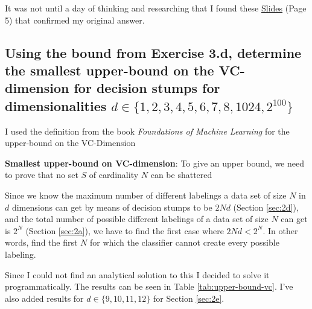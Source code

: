 \documentclass[11pt,a4paper]{article}
\begin{document}
It was not until a day of thinking and researching that I found these \href{https://people.csail.mit.edu/alinush/6.867-fall-2013/2013.10.22.w8.tu-lecture-13-generalization-part-2.pdf}{Slides} (Page 5) that confirmed my original answer.

\subsection{Using the bound from Exercise 3.d, determine the smallest upper-bound on the VC-dimension for decision stumps for dimensionalities $d ∈ \{1, 2, 3, 4, 5, 6, 7, 8, 1024, 2^{100}\}$}
\label{sec:3e}
I used the definition from the book \textit{Foundations of Machine Learning} \cite{foundations_of_machine_learning} for the upper-bound on the VC-Dimension

\textbf{Smallest upper-bound on VC-dimension}: To give an upper bound, we need to prove that no set $S$ of cardinality $N$ can be shattered

Since we know the maximum number of different labelings a data set of size $N$ in $d$ dimensions can get by means of decision stumps to be $2Nd$ (Section \ref{sec:2d}), and the total number of possible different labelings of a data set of size $N$ can get is $2^N$ (Section \ref{sec:2a}), we have to find the first case where $2Nd < 2^N$. In other words, find the first $N$ for which the classifier cannot create every possible labeling.

Since I could not find an analytical solution to this I decided to solve it programmatically. The results can be seen in Table \ref{tab:upper-bound-vc}. I've also added results for $d \in \{9, 10, 11, 12\}$ for Section \ref{sec:2e}.
\end{document}
